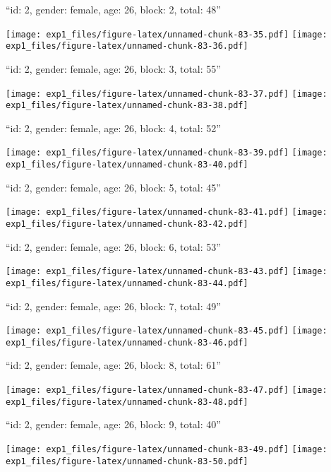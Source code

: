 \documentclass[11pt,,]{article}
\begin{document}
``id: 2, gender: female, age: 26, block: 2, total: 48''

\texttt{[image: exp1\_files/figure-latex/unnamed-chunk-83-35.pdf]}
\texttt{[image: exp1\_files/figure-latex/unnamed-chunk-83-36.pdf]}

\newpage
[1] 

``id: 2, gender: female, age: 26, block: 3, total: 55''

\texttt{[image: exp1\_files/figure-latex/unnamed-chunk-83-37.pdf]}
\texttt{[image: exp1\_files/figure-latex/unnamed-chunk-83-38.pdf]}

\newpage
[1] 

``id: 2, gender: female, age: 26, block: 4, total: 52''

\texttt{[image: exp1\_files/figure-latex/unnamed-chunk-83-39.pdf]}
\texttt{[image: exp1\_files/figure-latex/unnamed-chunk-83-40.pdf]}

\newpage
[1] 

``id: 2, gender: female, age: 26, block: 5, total: 45''

\texttt{[image: exp1\_files/figure-latex/unnamed-chunk-83-41.pdf]}
\texttt{[image: exp1\_files/figure-latex/unnamed-chunk-83-42.pdf]}

\newpage
[1] 

``id: 2, gender: female, age: 26, block: 6, total: 53''

\texttt{[image: exp1\_files/figure-latex/unnamed-chunk-83-43.pdf]}
\texttt{[image: exp1\_files/figure-latex/unnamed-chunk-83-44.pdf]}

\newpage
[1] 

``id: 2, gender: female, age: 26, block: 7, total: 49''

\texttt{[image: exp1\_files/figure-latex/unnamed-chunk-83-45.pdf]}
\texttt{[image: exp1\_files/figure-latex/unnamed-chunk-83-46.pdf]}

\newpage
[1] 

``id: 2, gender: female, age: 26, block: 8, total: 61''

\texttt{[image: exp1\_files/figure-latex/unnamed-chunk-83-47.pdf]}
\texttt{[image: exp1\_files/figure-latex/unnamed-chunk-83-48.pdf]}

\newpage
[1] 

``id: 2, gender: female, age: 26, block: 9, total: 40''

\texttt{[image: exp1\_files/figure-latex/unnamed-chunk-83-49.pdf]}
\texttt{[image: exp1\_files/figure-latex/unnamed-chunk-83-50.pdf]}

\newpage
[1] 
\end{document}
